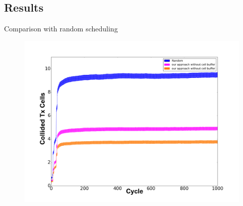 \subsection{ Results}
\begin{withoutheadline}
\begin{frame}{Comparison with random scheduling}

\begin{figure}[p]

\includegraphics[width=\linewidth]{figures/graph1.png}

\end{figure}



\end{frame}
\end{withoutheadline}

